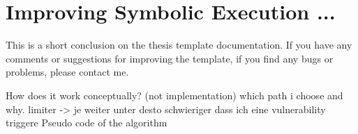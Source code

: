 \chapter{Improving Symbolic Execution ...}

This is a short conclusion on the thesis template documentation. If you have any comments or suggestions for improving the template, if you find any bugs or problems, please contact me. 

How does it work conceptually? (not implementation) which path i choose and why. limiter -> je weiter unter desto schwieriger dass ich eine vulnerability triggere
Pseudo code of the algorithm

